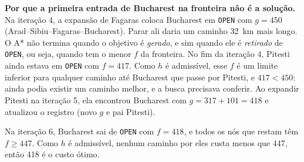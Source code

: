 \documentclass[11pt,a4paper]{article}
\begin{document}
\textbf{Por que a primeira entrada de Bucharest na fronteira não é a solução.} Na iteração 4, a expansão de Fagaras
coloca Bucharest em \texttt{OPEN} com $g = 450$ (Arad--Sibiu--Fagaras--Bucharest). Parar ali daria um caminho 32~km
mais longo. O A* não termina quando o objetivo é \emph{gerado}, e sim quando ele é \emph{retirado} de \texttt{OPEN},
ou seja, quando tem o menor $f$ da fronteira. No fim da iteração 4, Pitesti ainda estava em \texttt{OPEN} com
$f = 417$. Como $h$ é admissível, esse $f$ é um limite inferior para qualquer caminho até Bucharest que passe por
Pitesti, e $417 < 450$: ainda podia existir um caminho melhor, e a busca precisava conferir. Ao expandir Pitesti na
iteração 5, ela encontrou Bucharest com $g = 317 + 101 = 418$ e atualizou o registro (novo $g$ e pai Pitesti).

Na iteração 6, Bucharest sai de \texttt{OPEN} com $f = 418$, e todos os nós que restam têm $f \ge 447$. Como $h$ é
admissível, nenhum caminho por eles custa menos que 447, então 418 é o custo ótimo.
\end{document}

